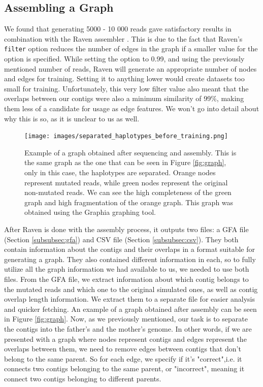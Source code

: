 \documentclass[times, utf8, diplomski, english]{fer_eng}
\begin{document}
\subsection{Assembling a Graph}
\label{subsec:assembling the graph}

We found that generating 5000 - 10 000 reads gave satisfactory results in combination with the Raven assembler \cite{Vaser}. This is due to the fact that Raven's \texttt{filter} option reduces the number of edges in the graph if a smaller value for the option is specified. While setting the option to 0.99, and using the previously mentioned number of reads, Raven will generate an appropriate number of nodes and edges for training. Setting it to anything lower would create datasets too small for training. Unfortunately, this very low filter value also meant that the overlaps between our contigs were also a minimum similarity of 99\%, making them less of a candidate for usage as edge features. We won't go into detail about why this is so, as it is unclear to us as well.

\begin{figure}[h]
	\centering
	\texttt{[image: images/separated\_haplotypes\_before\_training.png]}
	\caption[Separated graph]{Example of a graph obtained after sequencing and assembly. This is the same graph as the one that can be seen in Figure \ref{fig:graph}, only in this case, the haplotypes are separated. Orange nodes represent mutated reads, while green nodes represent the original non-mutated reads. We can see the high completeness of the green graph and high fragmentation of the orange graph. This graph was obtained using the Graphia\footnotemark{} graphing tool.}
	\label{fig:separated graph}
\end{figure}

After Raven is done with the assembly process, it outputs two files: a GFA file (Section \ref{subsubsec:gfa}) and CSV file (Section \ref{subsubsec:csv}). They both contain information about the contigs and their overlaps in a format suitable for generating a graph. They also contained different information in each, so to fully utilize all the graph information we had available to us, we needed to use both files. From the GFA file, we extract information about which contig belongs to the mutated reads and which one to the original simulated ones, as well as contig overlap length information. We extract them to a separate file for easier analysis and quicker fetching. An example of a graph obtained after assembly can be seen in Figure \ref{fig:graph}. Now, as we previously mentioned, our task is to separate the contigs into the father's and the mother's genome. In other words, if we are presented with a graph where nodes represent contigs and edges represent the overlaps between them, we need to remove edges between contigs that don't belong to the same parent. So for each edge, we specify if it's "correct",i.e. it connects two contigs belonging to the same parent, or "incorrect", meaning it connect two contigs belonging to different parents.
\end{document}

